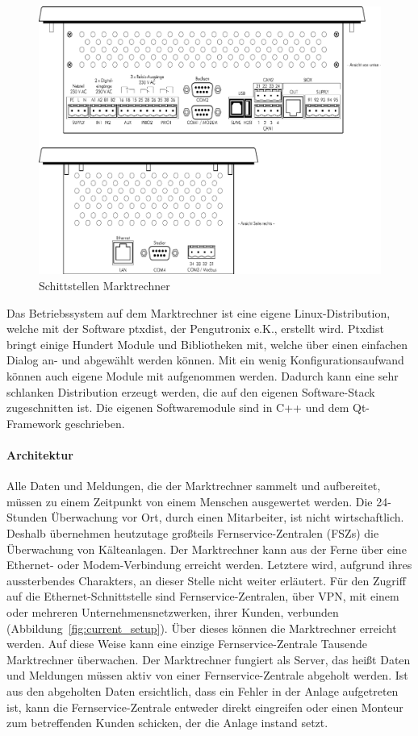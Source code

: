 \documentclass[11pt,a4paper]{report}
\begin{document}
\begin{figure}[h]
\centering
\includegraphics[scale=0.54]{images/CI4000_Hardware.pdf}
\caption{Schittstellen Marktrechner}
\label{fig:marktrechner_interfaces}
\end{figure}

Das Betriebssystem auf dem Marktrechner ist eine eigene Linux-Distribution, welche mit der Software ptxdist, der  Pengutronix e.K., erstellt wird. Ptxdist bringt einige Hundert Module und Bibliotheken mit, welche über einen einfachen Dialog an- und abgewählt werden können. Mit ein wenig Konfigurationsaufwand können auch eigene Module mit aufgenommen werden. Dadurch kann eine sehr schlanken Distribution erzeugt werden, die  auf den eigenen Software-Stack zugeschnitten ist. Die eigenen Softwaremodule sind in C++ und dem Qt-Framework geschrieben. 

\paragraph{Architektur}

Alle Daten und Meldungen, die der Marktrechner sammelt und aufbereitet, müssen zu einem Zeitpunkt von einem Menschen ausgewertet werden. Die 24-Stunden Überwachung vor Ort, durch einen Mitarbeiter, ist nicht wirtschaftlich. Deshalb übernehmen heutzutage großteils Fernservice-Zentralen (FSZs) die Überwachung von Kälteanlagen. Der Marktrechner kann aus der Ferne über eine Ethernet- oder Modem-Verbindung erreicht werden. Letztere wird, aufgrund ihres aussterbendes Charakters, an dieser Stelle nicht weiter erläutert. Für den Zugriff auf die Ethernet-Schnittstelle sind Fernservice-Zentralen, über VPN, mit einem oder mehreren Unternehmensnetzwerken, ihrer Kunden, verbunden (Abbildung~\ref{fig:current_setup}). Über dieses können die Marktrechner erreicht werden. Auf diese Weise kann eine einzige Fernservice-Zentrale Tausende Marktrechner überwachen. Der Marktrechner fungiert als Server, das heißt Daten und Meldungen müssen aktiv von einer Fernservice-Zentrale abgeholt werden. Ist aus den abgeholten Daten ersichtlich, dass ein Fehler in der Anlage aufgetreten ist, kann die Fernservice-Zentrale entweder direkt eingreifen oder einen Monteur zum betreffenden Kunden schicken, der die Anlage instand setzt.
\end{document}

